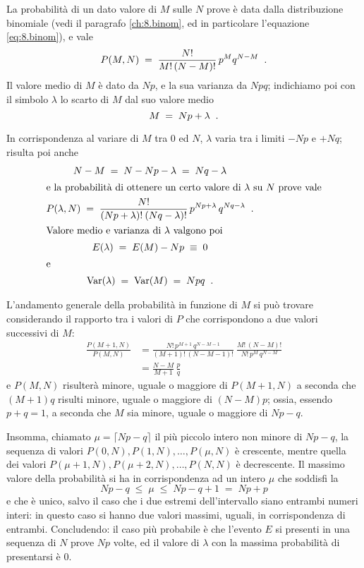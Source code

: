 La probabilit\`a di un dato valore di $M$ sulle $N$ prove
\`e data dalla distribuzione binomiale (vedi il paragrafo
\ref{ch:8.binom}, ed in particolare l'equazione
\eqref{eq:8.binom}), e vale
\begin{equation*}
  P(M,N) \; = \; \frac{N!}{M! \, (N-M)!} \,
    p^M q^{N-M} \;\; .
\end{equation*}
Il valore medio di $M$ \`e dato da $Np$, e la sua varianza
da $Npq$; indichiamo poi con il simbolo $\lambda$ lo scarto
di $M$ dal suo valore medio
\begin{equation*}
  M \; = \; Np + \lambda \;\; .
\end{equation*}

In corrispondenza al variare di $M$ tra 0 ed $N$, $\lambda$
varia tra i limiti $-Np$ e $+Nq$; risulta poi anche
\begin{gather*}
  N-M \; = \; N - Np - \lambda \; = \;
    Nq - \lambda \\
  \intertext{e la probabilit\`a di ottenere un
    certo valore di $\lambda$ su $N$ prove vale}
  P(\lambda,N) \; = \; \frac{N!}{(Np+\lambda)!
    \: (Nq-\lambda)!} \, p^{Np+\lambda} \,
    q^{Nq-\lambda} \;\; . \\
  \intertext{Valore medio e varianza di $\lambda$
    valgono poi}
  E(\lambda) \; = \; E(M) - Np \; \equiv \; 0 \\
  \intertext{e}
  \operatorname{Var} (\lambda) \; = \; \operatorname{Var} (M) \; = \; Npq \;\; .
\end{gather*}

L'andamento generale della probabilit\`a in funzione di $M$
si pu\`o trovare considerando il rapporto tra i valori di
$P$ che corrispondono a due valori successivi di $M $:
\begin{align*}
  \frac{P(M+1, N)}{P(M, N)} &=
    \frac{N! \, p^{M+1} \, q^{N-M-1}}{(M+1)!
    \, (N-M-1)!} \: \frac{M! \, (N-M)!}{N!
    \, p^M \, q^{N-M}} \\[1ex]
  &= \frac{N-M}{M+1} \, \frac{p}{q}
\end{align*}
e $P(M, N)$ risulter\`a minore, uguale o maggiore di $P(M+1,
N)$ a seconda che $(M+1)q$ risulti minore, uguale o maggiore
di $(N-M)p$; ossia, essendo $p+q=1$, a seconda che $M$ sia
minore, uguale o maggiore di $Np-q$.

Insomma, chiamato $\mu = \lceil Np-q \rceil$ il pi\`u
piccolo intero non minore di $Np-q$, la sequenza di valori
$P(0, N), P(1, N),\ldots, P(\mu, N)$ \`e crescente, mentre
quella dei valori $P(\mu+1, N), P(\mu+2, N),\ldots, P(N, N)$
\`e decrescente.  Il massimo valore della probabilit\`a si
ha in corrispondenza ad un intero $\mu$ che soddisfi la
\begin{equation*}
  Np-q \; \le \; \mu \; \le \; Np-q+1 \; = \; Np+p
\end{equation*}
e che \`e unico, salvo il caso che i due estremi
dell'intervallo siano entrambi numeri interi: in questo caso
si hanno due valori massimi, uguali, in corrispondenza di
entrambi.  Concludendo: il caso pi\`u probabile \`e che
l'evento $E$ si presenti in una sequenza di $N$ prove $Np$
volte, ed il valore di $\lambda$ con la massima
probabilit\`a di presentarsi \`e 0.

